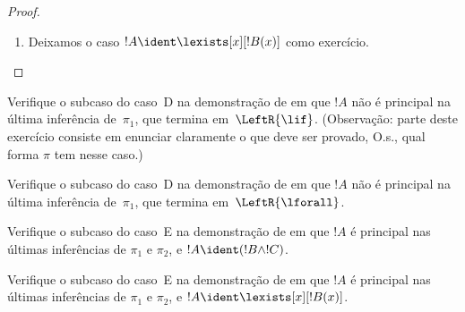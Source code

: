 \documentclass[../../../include/open-logic-section]{subfiles}
\begin{document}
\begin{proof}
\begin{enumerate}
A !!{proof}~$\pi_1'$ tem sequente final $\Gamma \Sequent \Delta,
!B(c)$, onde $c$ é a variável própria de uma inferência
$\RightR{\lforall}$. Logo, $c$ não ocorre em~$!B(x)$, $\Gamma$ nem
$\Delta$. Supomos que a !!{proof}~$\pi$ seja regular; portanto, $c$ é a
variável própria apenas da inferência $\RightR{\lforall}$ seguinte e só
ocorre acima dela, O.s.\@, ocorre apenas em~$\pi_1'$ e não é variável
própria de nenhuma inferência em~$\pi_1'$. Como $c$ não ocorre em
$\pi_2$, não pode ocorrer em~$t$. Por
, a
!!{proof}~$\Subst{\pi_1'}{t}{c}$ é !!a{proof} de $\Gamma \Sequent
\Delta, !B(t)$. Aplicamos agora a hipótese de indução à !!{proof}
\[
\AxiomC{}
\RightLabel{$\Subst{\pi_1'}{t}{c}$}
\Deduce$\Gamma \fCenter \Delta, !B(t)$
\AxiomC{}
\RightLabel{$\pi_2''$}
\Deduce$!B(t), \Gamma \fCenter \Delta$
\RightLabel{\CutCS}
\BinaryInf$\Gamma \fCenter \Delta$
\DisplayProof
\]
(A hipótese de indução se aplica porque a !!{formula} de corte é~$!B(t)$;
assim, a !!{proof} tem posto de corte menor que~$\pi$.)
\item Deixamos o caso $!A \ident \lexists[x][!B(x)]$ como exercício.
\end{enumerate}
\end{proof}

\begin{prob}
Verifique o subcaso do caso~D na demonstração de
 em que $!A$ não é principal na última inferência
de~$\pi_1$, que termina em~$\LeftR{\lif}$. (Observação: parte deste
exercício consiste em enunciar claramente o que deve ser provado, O.s.\@, qual forma $\pi$ tem nesse caso.)
\end{prob}

\begin{prob}
Verifique o subcaso do caso~D na demonstração de
 em que $!A$ não é principal na última inferência
de~$\pi_1$, que termina em~$\LeftR{\lforall}$.
\end{prob}

\begin{prob}
Verifique o subcaso do caso~E na demonstração de
 em que $!A$ é principal nas últimas inferências
de $\pi_1$ e $\pi_2$, e $!A \ident (!B \land !C)$.
\end{prob}

\begin{prob}
Verifique o subcaso do caso~E na demonstração de
 em que $!A$ é principal nas últimas inferências
de $\pi_1$ e $\pi_2$, e $!A \ident \lexists[x][!B(x)]$.
\end{prob}
\end{document}
